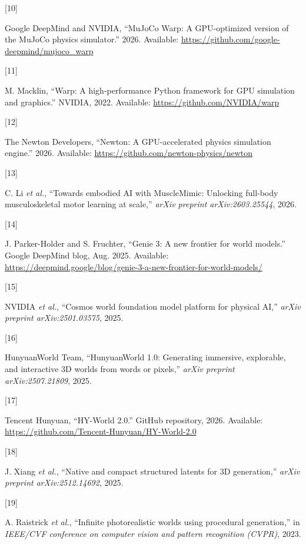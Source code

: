 \documentclass[
  11pt,
]{article}
\newlength{\cslhangindent}
\newlength{\csllabelwidth}
\newenvironment{CSLReferences}[2] %
 {\begin{list}{}{%
  \setlength{\itemindent}{0pt}
  \setlength{\leftmargin}{0pt}
  \setlength{\parsep}{0pt}
  \ifodd #1
   \setlength{\leftmargin}{\cslhangindent}
   \setlength{\itemindent}{-1\cslhangindent}
  \fi
  \setlength{\itemsep}{#2\baselineskip}}}
 {\end{list}}
\newcommand{\CSLLeftMargin}[1]{\parbox[t]{\csllabelwidth}{\strut#1\strut}}
\newcommand{\CSLRightInline}[1]{\parbox[t]{\linewidth - \csllabelwidth}{\strut#1\strut}}
\begin{document}
\begin{CSLReferences}{0}{0}
\CSLLeftMargin{{[}10{]} }%
\CSLRightInline{Google DeepMind and NVIDIA, {``{MuJoCo Warp}: A
{GPU}-optimized version of the {MuJoCo} physics simulator.''} 2026.
Available: \url{https://github.com/google-deepmind/mujoco_warp}}

\CSLLeftMargin{{[}11{]} }%
\CSLRightInline{M. Macklin, {``{Warp}: A high-performance {Python}
framework for {GPU} simulation and graphics.''} NVIDIA, 2022. Available:
\url{https://github.com/NVIDIA/warp}}

\CSLLeftMargin{{[}12{]} }%
\CSLRightInline{The Newton Developers, {``{Newton}: A {GPU}-accelerated
physics simulation engine.''} 2026. Available:
\url{https://github.com/newton-physics/newton}}

\CSLLeftMargin{{[}13{]} }%
\CSLRightInline{C. Li \emph{et al.}, {``Towards embodied {AI} with
{MuscleMimic}: Unlocking full-body musculoskeletal motor learning at
scale,''} \emph{arXiv preprint arXiv:2603.25544}, 2026.}

\CSLLeftMargin{{[}14{]} }%
\CSLRightInline{J. Parker-Holder and S. Fruchter, {``{Genie 3: A new
frontier for world models}.''} Google DeepMind blog, Aug. 2025.
Available:
\url{https://deepmind.google/blog/genie-3-a-new-frontier-for-world-models/}}

\CSLLeftMargin{{[}15{]} }%
\CSLRightInline{{NVIDIA \emph{et al.}}, {``{Cosmos} world foundation
model platform for physical {AI},''} \emph{arXiv preprint
arXiv:2501.03575}, 2025.}

\CSLLeftMargin{{[}16{]} }%
\CSLRightInline{HunyuanWorld Team, {``{HunyuanWorld 1.0}: Generating
immersive, explorable, and interactive {3D} worlds from words or
pixels,''} \emph{arXiv preprint arXiv:2507.21809}, 2025.}

\CSLLeftMargin{{[}17{]} }%
\CSLRightInline{Tencent Hunyuan, {``{HY-World} 2.0.''} GitHub
repository, 2026. Available:
\url{https://github.com/Tencent-Hunyuan/HY-World-2.0}}

\CSLLeftMargin{{[}18{]} }%
\CSLRightInline{J. Xiang \emph{et al.}, {``Native and compact structured
latents for {3D} generation,''} \emph{arXiv preprint arXiv:2512.14692},
2025.}

\CSLLeftMargin{{[}19{]} }%
\CSLRightInline{A. Raistrick \emph{et al.}, {``Infinite photorealistic
worlds using procedural generation,''} in \emph{IEEE/CVF conference on
computer vision and pattern recognition (CVPR)}, 2023.}


\end{CSLReferences}
\end{document}
